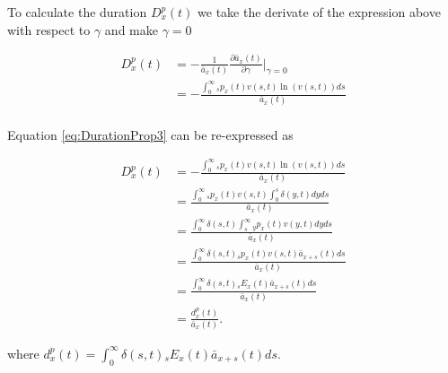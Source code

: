 \documentclass[12pt]{article}
\begin{document}
To calculate the duration ${D}^{p}_{x}(t)$ we take the derivate of the expression above with respect to $\gamma$ and make $\gamma=0$

\begin{equation}\label{eq:DurationProp3}
\begin{split}
{D}^{p}_{x}(t)&=-\frac{1}{\bar{a}_x(t)}\frac{\partial \bar{a}_x(t)}{\partial \gamma} \bigg\rvert_{\gamma=0} \\
&= -\frac{\int_0^\infty {}_sp_x(t) v(s,t) \ln(v(s,t))ds}{\bar{a}_x(t)} \\
\end{split}
\end{equation}


Equation \ref{eq:DurationProp3} can be re-expressed as 


\begin{equation}\label{eq:DurationProp4}
\begin{split}
{D}^{p}_{x}(t) &= -\frac{\int_0^\infty {}_sp_x(t) v(s,t) \ln(v(s,t))ds}{\bar{a}_x(t)}\\
&= \frac{\int_0^\infty {}_sp_x(t) v(s,t) \int_0^{s} \delta(y,t)dy ds }{\bar{a}_x(t)}\\
&= \frac{\int_0^\infty \delta(s,t)  \int_{s}^{\infty} {}_{y}p_x(t) v(y,t)dy ds }{\bar{a}_x(t)}\\
&= \frac{\int_0^\infty \delta(s,t) {}_sp_x(t) v(s,t) \bar{a}_{x+s}(t)  ds }{\bar{a}_x(t)}\\
&= \frac{\int_0^\infty \delta(s,t) {}_sE_x(t) \bar{a}_{x+s}(t) ds}{\bar{a}_x(t)} \\
&= \frac{{d}^{p}_{x}(t)}{\bar{a}_x(t)}.
\end{split}
\end{equation}



where ${d}^{p}_{x}(t)=\int_0^\infty \delta(s,t) {}_sE_x(t) \bar{a}_{x+s}(t) ds$.
\end{document}
